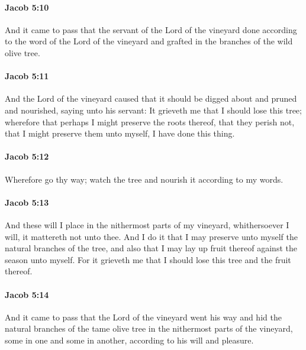 		\paragraph{Jacob 5:10} %
			\label{JACOB-5-10}

			And it came to pass that the servant of the Lord of the vineyard
			done according to the word of the Lord of the vineyard
			and grafted in the branches of the wild olive tree.

		\paragraph{Jacob 5:11} %
			\label{JACOB-5-11}

			And the Lord of the vineyard caused
			that it should be digged about and pruned and nourished,
			saying unto his servant:
			It grieveth me that I should lose this tree;
			wherefore that perhaps I might preserve the roots thereof,
			that they perish not, that I might preserve them unto myself,
			I have done this thing.

		\paragraph{Jacob 5:12} %
			\label{JACOB-5-12}

			Wherefore go thy way;
			watch the tree and nourish it according to my words.

		\paragraph{Jacob 5:13} %
			\label{JACOB-5-13}

			And these will I place in the nithermost parts of my vineyard,
			whithersoever I will, it mattereth not unto thee.
			And I do it that I may preserve unto myself the natural branches of the tree,
			and also that I may lay up fruit thereof against the season unto myself.
			For it grieveth me that I should lose this tree and the fruit thereof.

		\paragraph{Jacob 5:14} %
			\label{JACOB-5-14}

			And it came to pass that the Lord of the vineyard went his way
			and hid the natural branches of the tame olive tree
			in the nithermost parts of the vineyard, some in one and some in another,
			according to his will and pleasure.

